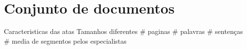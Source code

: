 
\section{Conjunto de documentos}
	\label{sec:conjutodedocumentos} 




Caracteristicas das atas
  Tamanhos diferentes
  # paginas
  # palavras
  # sentenças
  # media de segmentos pelos especialistas












%

%

















